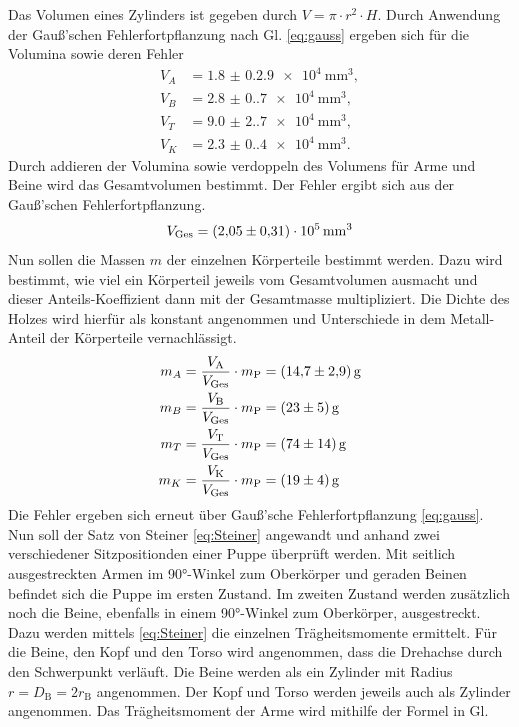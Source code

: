 Das Volumen eines Zylinders ist gegeben durch $V=\pi\cdot r^2\cdot H$. Durch Anwendung der Gauß'schen Fehlerfortpflanzung nach Gl. \eqref{eq:gauss}
ergeben sich für die Volumina sowie deren Fehler 
\begin{align*}
  V_A&=\SI{1.8(0.29)e4}{\milli\meter\cubed},\\
  V_B&=\SI{2.8(0.7)e4} {\milli\meter\cubed},\\
  V_T&=\SI{9.0(2.7)e4} {\milli\meter\cubed},\\
  V_K&=\SI{2.3(0.4)e4} {\milli\meter\cubed}.
\end{align*}
Durch addieren der Volumina sowie verdoppeln des Volumens für Arme und Beine 
wird das Gesamtvolumen bestimmt. Der Fehler ergibt sich aus der Gauß'schen Fehlerfortpflanzung.
\begin{equation*}
  V_\text{Ges}=\qty{2,05+-0,31e5}{\milli\meter\cubed}
\end{equation*}
Nun sollen die Massen $m$ der einzelnen Körperteile bestimmt werden. Dazu wird bestimmt, wie viel
ein Körperteil jeweils vom Gesamtvolumen ausmacht und dieser Anteils-Koeffizient dann mit 
der Gesamtmasse multipliziert. Die Dichte des Holzes wird hierfür als konstant angenommen und
Unterschiede in dem Metall-Anteil der Körperteile vernachlässigt.
\begin{align*}
  m_A&=\frac{V_\text{A}}{V_\text{Ges}}\cdot m_\text{P}=\qty{14.7+-2.9}{\gram}\\
  m_B&=\frac{V_\text{B}}{V_\text{Ges}}\cdot m_\text{P}=\qty{23+-5}{\gram}\\
  m_T&=\frac{V_\text{T}}{V_\text{Ges}}\cdot m_\text{P}=\qty{74+-14}{\gram}\\
  m_K&=\frac{V_\text{K}}{V_\text{Ges}}\cdot m_\text{P}=\qty{19+-4}{\gram}
\end{align*}
  Die Fehler ergeben sich erneut über Gauß'sche Fehlerfortpflanzung \eqref{eq:gauss}.
Nun soll der Satz von Steiner \eqref{eq:Steiner} angewandt und
anhand zwei verschiedener Sitzpositionden einer Puppe überprüft werden. Mit seitlich ausgestreckten
Armen im 90°-Winkel zum Oberkörper und geraden Beinen befindet sich die Puppe im ersten Zustand.
Im zweiten Zustand werden zusätzlich noch die Beine, ebenfalls in einem 90°-Winkel zum Oberkörper, ausgestreckt.
Dazu werden mittels \eqref{eq:Steiner} die einzelnen Trägheitsmomente ermittelt.
Für die Beine, den Kopf und den Torso wird angenommen, dass die Drehachse durch den Schwerpunkt
verläuft. Die Beine werden als ein Zylinder mit Radius $r=D_\text{B}=2r_\text{B}$ angenommen. Der Kopf und Torso werden
jeweils auch als Zylinder angenommen. Das Trägheitsmoment der Arme wird mithilfe der Formel in Gl.

